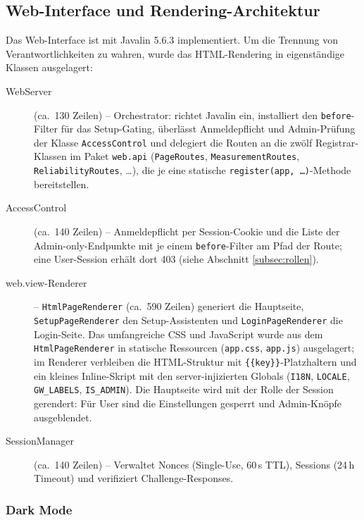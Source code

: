 \subsection{Web-Interface und Rendering-Architektur}

Das Web-Interface ist mit Javalin 5.6.3 implementiert. Um die Trennung von
Verantwortlichkeiten zu wahren, wurde das HTML-Rendering in eigenständige Klassen
ausgelagert:

\begin{description}
  \item[WebServer] (ca.\ 130 Zeilen) -- Orchestrator: richtet Javalin ein, installiert den
    \texttt{before}-Filter für das Setup-Gating, überlässt Anmeldepflicht und Admin-Prüfung
    der Klasse \texttt{AccessControl} und delegiert die Routen an die zwölf
    Registrar-Klassen im Paket \texttt{web.api} (\texttt{PageRoutes}, \texttt{MeasurementRoutes},
    \texttt{ReliabilityRoutes}, \dots), die je eine statische \texttt{register(app, \dots)}-Methode
    bereitstellen.
  \item[AccessControl] (ca.\ 140 Zeilen) -- Anmeldepflicht per Session-Cookie und die Liste
    der Admin-only-Endpunkte mit je einem \texttt{before}-Filter am Pfad der Route; eine
    User-Session erhält dort 403 (siehe Abschnitt \ref{subsec:rollen}).
  \item[web.view-Renderer] -- \texttt{HtmlPageRenderer} (ca.\ 590 Zeilen) generiert die
    Hauptseite, \texttt{SetupPageRenderer} den Setup-Assistenten und \texttt{LoginPageRenderer}
    die Login-Seite. Das umfangreiche CSS und JavaScript wurde aus dem \texttt{HtmlPageRenderer}
    in statische Ressourcen (\texttt{app.css}, \texttt{app.js}) ausgelagert; im Renderer
    verbleiben die HTML-Struktur mit \texttt{\{\{key\}\}}-Platzhaltern und ein kleines
    Inline-Skript mit den server-injizierten Globals (\texttt{I18N}, \texttt{LOCALE},
    \texttt{GW\_LABELS}, \texttt{IS\_ADMIN}). Die Hauptseite wird mit der Rolle der Session
    gerendert: Für User sind die Einstellungen gesperrt und Admin-Knöpfe ausgeblendet.
  \item[SessionManager] (ca.\ 140 Zeilen) -- Verwaltet Nonces (Single-Use, 60\,s TTL),
    Sessions (24\,h Timeout) und verifiziert Challenge-Responses.
\end{description}

\subsubsection{Dark Mode}

